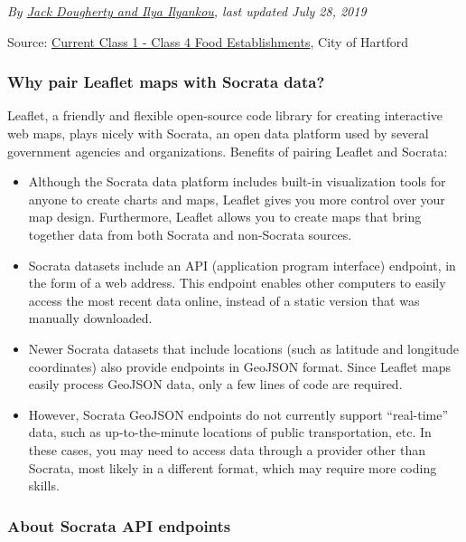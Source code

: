 \documentclass[
  english,
]{book}
\begin{document}
\emph{By \href{authors}{Jack Dougherty and Ilya Ilyankou}, last updated July 28, 2019}

Source: \href{https://data.hartford.gov/Public-Health/Current-Class-1-Class-4-Food-Establishments/xkvv-76v8}{Current Class 1 - Class 4 Food Establishments}, City of Hartford

\hypertarget{why-pair-leaflet-maps-with-socrata-data}{%
\subsubsection*{Why pair Leaflet maps with Socrata data?}\label{why-pair-leaflet-maps-with-socrata-data}}

Leaflet, a friendly and flexible open-source code library for creating interactive web maps, plays nicely with Socrata, an open data platform used by several government agencies and organizations. Benefits of pairing Leaflet and Socrata:

\begin{itemize}
\item
  Although the Socrata data platform includes built-in visualization tools for anyone to create charts and maps, Leaflet gives you more control over your map design. Furthermore, Leaflet allows you to create maps that bring together data from both Socrata and non-Socrata sources.
\item
  Socrata datasets include an API (application program interface) endpoint, in the form of a web address. This endpoint enables other computers to easily access the most recent data online, instead of a static version that was manually downloaded.
\item
  Newer Socrata datasets that include locations (such as latitude and longitude coordinates) also provide endpoints in GeoJSON format. Since Leaflet maps easily process GeoJSON data, only a few lines of code are required.
\item
  However, Socrata GeoJSON endpoints do not currently support ``real-time'' data, such as up-to-the-minute locations of public transportation, etc. In these cases, you may need to access data through a provider other than Socrata, most likely in a different format, which may require more coding skills.
\end{itemize}

\hypertarget{about-socrata-api-endpoints}{%
\subsubsection*{About Socrata API endpoints}\label{about-socrata-api-endpoints}}
\end{document}
